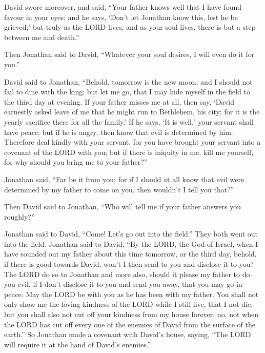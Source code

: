  David swore moreover, and said, ``Your father knows well
that I have found favour in your eyes; and he says, `Don't let Jonathan
know this, lest he be grieved;' but truly as the LORD lives, and as your
soul lives, there is but a step between me and death.''

 Then Jonathan said to David, ``Whatever your soul
desires, I will even do it for you.''

 David said to Jonathan, ``Behold, tomorrow is the new
moon, and I should not fail to dine with the king; but let me go, that I
may hide myself in the field to the third day at evening. 
If your father misses me at all, then say, `David earnestly asked leave
of me that he might run to Bethlehem, his city; for it is the yearly
sacrifice there for all the family.'  If he says, `It is
well,' your servant shall have peace; but if he is angry, then know that
evil is determined by him.  Therefore deal kindly with
your servant, for you have brought your servant into a covenant of the
LORD with you; but if there is iniquity in me, kill me yourself, for why
should you bring me to your father?''

 Jonathan said, ``Far be it from you; for if I should at
all know that evil were determined by my father to come on you, then
wouldn't I tell you that?''

 Then David said to Jonathan, ``Who will tell me if your
father answers you roughly?''

 Jonathan said to David, ``Come! Let's go out into the
field.'' They both went out into the field.  Jonathan
said to David, ``By the LORD, the God of Israel, when I have sounded out
my father about this time tomorrow, or the third day, behold, if there
is good towards David, won't I then send to you and disclose it to you?
 The LORD do so to Jonathan and more also, should it
please my father to do you evil, if I don't disclose it to you and send
you away, that you may go in peace. May the LORD be with you as he has
been with my father.  You shall not only show me the
loving kindness of the LORD while I still live, that I not die;
 but you shall also not cut off your kindness from my
house forever, no, not when the LORD has cut off every one of the
enemies of David from the surface of the earth.''  So
Jonathan made a covenant with David's house, saying, ``The LORD will
require it at the hand of David's enemies.''

